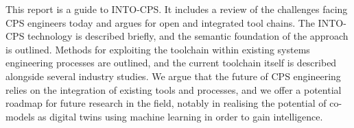 \documentclass[a4paper,12pt,final]{include/intocpsassociation}   %
\newenvironment{assumption}{\noindent\smallskip\color{blue}\begin{framed}\begin{minipage}{0.95\columnwidth}}{\end{minipage}\end{framed}\smallskip\par}
\begin{document}
This report is a guide to INTO-CPS. It includes a review of the challenges facing CPS engineers today and argues for open and integrated tool chains. The INTO-CPS technology is described briefly, and the semantic foundation of the approach is outlined. Methods for exploiting the toolchain within existing systems engineering processes are outlined, and the current toolchain itself is described alongside several industry studies. We argue that the future of CPS engineering relies on the integration of existing tools and processes, and we offer a potential roadmap for future research in the field, notably in realising the potential of co-models as digital twins using machine learning in order to gain intelligence.
\newpage
%
\tableofcontents
\newpage
%
%
%
%
%
%

\clearpage

\clearpage

\clearpage

\clearpage

\clearpage

\clearpage

\clearpage

\clearpage

\clearpage
%
%
%
%


\label{ch:bib} %
%
%
%
\clearpage
%
%
%
\appendix

\clearpage
%

%
%
%
\end{document}
